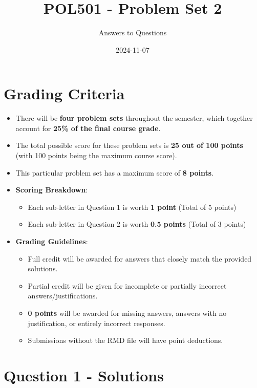 \documentclass[
  11pt,
]{article}
\title{POL501 - Problem Set 2}
\author{Answers to Questions}
\date{2024-11-07}
\providecommand{\tightlist}{%
  \setlength{\itemsep}{0pt}\setlength{\parskip}{0pt}}
\begin{document}
\maketitle

{
\setcounter{tocdepth}{2}
\tableofcontents
}
\section{Grading Criteria}\label{grading-criteria}

\begin{itemize}
\tightlist
\item
  There will be \textbf{four problem sets} throughout the semester,
  which together account for \textbf{25\% of the final course grade}.
\item
  The total possible score for these problem sets is \textbf{25 out of
  100 points} (with 100 points being the maximum course score).
\item
  This particular problem set has a maximum score of \textbf{8 points}.
\item
  \textbf{Scoring Breakdown}:

  \begin{itemize}
  \tightlist
  \item
    Each sub-letter in Question 1 is worth \textbf{1 point} (Total of 5
    points)
  \item
    Each sub-letter in Question 2 is worth \textbf{0.5 points} (Total of
    3 points)
  \end{itemize}
\item
  \textbf{Grading Guidelines}:

  \begin{itemize}
  \tightlist
  \item
    Full credit will be awarded for answers that closely match the
    provided solutions.
  \item
    Partial credit will be given for incomplete or partially incorrect
    answers/justifications.
  \item
    \textbf{0 points} will be awarded for missing answers, answers with
    no justification, or entirely incorrect responses.
  \item
    Submissions without the RMD file will have point deductions.
  \end{itemize}
\end{itemize}

\newpage

\section{Question 1 - Solutions}\label{question-1---solutions}
\end{document}
